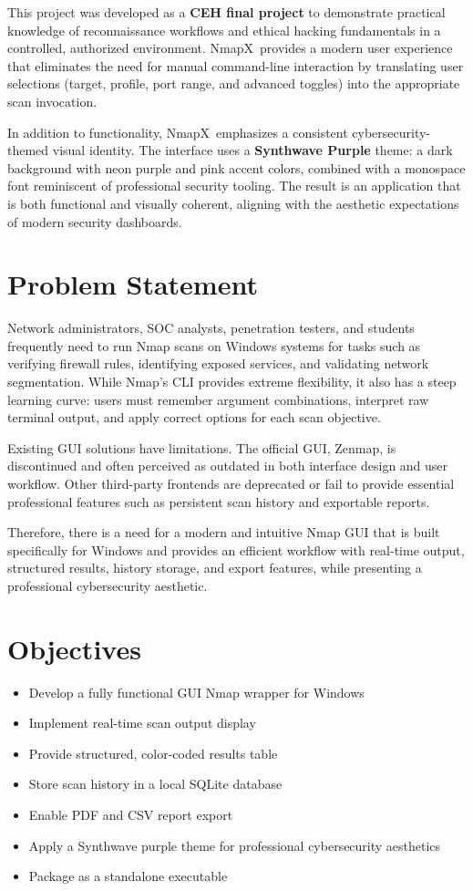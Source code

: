 \documentclass[12pt, a4paper]{report}
\newcommand{\NmapX}{NmapX}
\begin{document}
This project was developed as a \textbf{CEH final project} to demonstrate practical knowledge of reconnaissance workflows and ethical hacking fundamentals in a controlled, authorized environment. \NmapX\ provides a modern user experience that eliminates the need for manual command-line interaction by translating user selections (target, profile, port range, and advanced toggles) into the appropriate scan invocation.

In addition to functionality, \NmapX\ emphasizes a consistent cybersecurity-themed visual identity. The interface uses a \textbf{Synthwave Purple} theme: a dark background with neon purple and pink accent colors, combined with a monospace font reminiscent of professional security tooling. The result is an application that is both functional and visually coherent, aligning with the aesthetic expectations of modern security dashboards.

\section{Problem Statement}
Network administrators, SOC analysts, penetration testers, and students frequently need to run Nmap scans on Windows systems for tasks such as verifying firewall rules, identifying exposed services, and validating network segmentation. While Nmap's CLI provides extreme flexibility, it also has a steep learning curve: users must remember argument combinations, interpret raw terminal output, and apply correct options for each scan objective.

Existing GUI solutions have limitations. The official GUI, Zenmap, is discontinued and often perceived as outdated in both interface design and user workflow. Other third-party frontends are deprecated or fail to provide essential professional features such as persistent scan history and exportable reports.

Therefore, there is a need for a modern and intuitive Nmap GUI that is built specifically for Windows and provides an efficient workflow with real-time output, structured results, history storage, and export features, while presenting a professional cybersecurity aesthetic.

\section{Objectives}
\begin{itemize}[leftmargin=2.2em]
  \item Develop a fully functional GUI Nmap wrapper for Windows
  \item Implement real-time scan output display
  \item Provide structured, color-coded results table
  \item Store scan history in a local SQLite database
  \item Enable PDF and CSV report export
  \item Apply a Synthwave purple theme for professional cybersecurity aesthetics
  \item Package as a standalone executable
\end{itemize}
\end{document}
